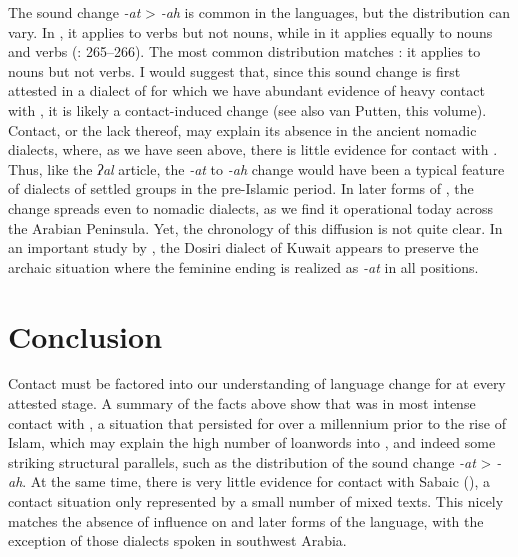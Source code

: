 \documentclass[output=paper]{langsci/langscibook}
\begin{document}
The sound change \textit{-at} > \textit{-ah} is common in the  languages, but the distribution can vary. In , it applies to verbs but not nouns, while in  it applies equally to nouns and verbs (\citealt{HuehnergardRubin2011}: 265--266). The most common  distribution matches : it applies to nouns but not verbs. I would suggest that, since this sound change is first attested in a dialect of  for which we have abundant evidence of heavy contact with , it is likely a contact-induced change (see also van Putten, this volume). Contact, or the lack thereof, may explain its absence in the ancient nomadic dialects, where, as we have seen above, there is little evidence for contact with . Thus, like the \textit{ʔal} {article}, the \textit{-at} to \textit{-ah} change would have been a typical feature of  dialects of settled groups in the pre-Islamic period. In later forms of , the change spreads even to nomadic dialects, as we find it operational today across the Arabian Peninsula. Yet, the chronology of this {diffusion} is not quite clear. In an important study by \citet{vanPutten2017}, the Dosiri dialect of Kuwait appears to preserve the archaic situation where the feminine ending is realized as \textit{-at} in all positions.

\section{Conclusion}
Contact must be factored into our understanding of {language change} for  at every attested stage. A summary of the facts above show that  was in most intense contact with , a situation that persisted for over a millennium prior to the rise of Islam, which may explain the high number of  {loanwords} into , and indeed some striking structural parallels, such as the distribution of the sound change \textit{-at} > \textit{-ah}. At the same time, there is very little evidence for contact with Sabaic (), a contact situation only represented by a small number of mixed texts.  This nicely matches the absence of  influence on   and later forms of the language, with the exception of those dialects spoken in southwest Arabia.
\end{document}
